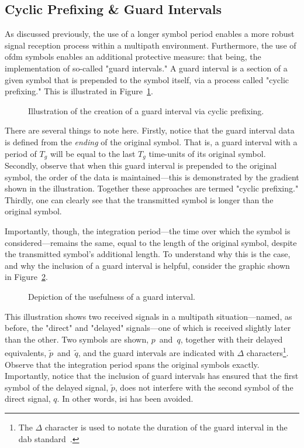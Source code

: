 \documentclass[class=report,11pt,crop=false]{standalone}
\begin{document}
\subsection{Cyclic Prefixing \& Guard Intervals}
As discussed previously, the use of a longer symbol period enables a more robust signal reception process within a multipath environment. Furthermore, the use of \gls{ofdm} symbols enables an additional protective measure: that being, the implementation of so-called "guard intervals." A guard interval is a section of a given symbol that is prepended to the symbol itself, via a process called "cyclic prefixing." This is illustrated in Figure~\ref{fig:cyclic-prefix}.
\begin{figure}[htbp]
    \centering
    \captionsetup{type=figure}
    \def\svgwidth{0.7\linewidth}
    { %
        }
    \caption{Illustration of the creation of a guard interval via cyclic prefixing.}
    \label{fig:cyclic-prefix}
\end{figure}
There are several things to note here. Firstly, notice that the guard interval data is defined from the \emph{ending} of the original symbol. That is, a guard interval with a period of \(T_g\) will be equal to the last \(T_g\) time-units of its original symbol. Secondly, observe that when this guard interval is prepended to the original symbol, the order of the data is maintained---this is demonstrated by the gradient shown in the illustration. Together these approaches are termed "cyclic prefixing." Thirdly, one can clearly see that the transmitted symbol is longer than the original symbol.

Importantly, though, the integration period---the time over which the symbol is considered---remains the same, equal to the length of the original symbol, despite the transmitted symbol's additional length. To understand why this is the case, and why the inclusion of a guard interval is helpful, consider the graphic shown in Figure~\ref{fig:guard-intervals-demo-2}.
\begin{figure}[htbp]
    \centering
    \captionsetup{type=figure}
    \def\svgwidth{\linewidth}
    { %
        }
    \caption{Depiction of the usefulness of a guard interval.}
    \label{fig:guard-intervals-demo-2}
\end{figure}
This illustration shows two received signals in a multipath situation---named, as before, the "direct" and "delayed" signals---one of which is received slightly later than the other. Two symbols are shown, \(p\)~and~\(q\), together with their delayed equivalents, \(\tilde{p}\)~and~\(\tilde{q}\), and the guard intervals are indicated with \(\Delta\) characters\footnote{The \(\Delta\) character is used to notate the duration of the guard interval in the \gls{dab} standard~\cite{dabstandard}.}. Observe that the integration period spans the original symbols exactly. Importantly, notice that the inclusion of guard intervals has ensured that the first symbol of the delayed signal, \(\tilde{p}\), does not interfere with the second symbol of the direct signal, \(q\). In other words, \gls{isi} has been avoided.
\end{document}
